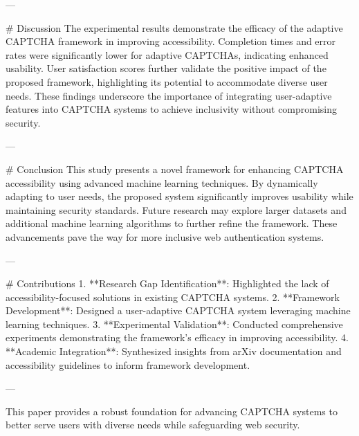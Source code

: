 ---

# Discussion  
The experimental results demonstrate the efficacy of the adaptive CAPTCHA framework in improving accessibility. Completion times and error rates were significantly lower for adaptive CAPTCHAs, indicating enhanced usability. User satisfaction scores further validate the positive impact of the proposed framework, highlighting its potential to accommodate diverse user needs. These findings underscore the importance of integrating user-adaptive features into CAPTCHA systems to achieve inclusivity without compromising security.

---

# Conclusion  
This study presents a novel framework for enhancing CAPTCHA accessibility using advanced machine learning techniques. By dynamically adapting to user needs, the proposed system significantly improves usability while maintaining security standards. Future research may explore larger datasets and additional machine learning algorithms to further refine the framework. These advancements pave the way for more inclusive web authentication systems.

---

# Contributions  
1. **Research Gap Identification**: Highlighted the lack of accessibility-focused solutions in existing CAPTCHA systems.  
2. **Framework Development**: Designed a user-adaptive CAPTCHA system leveraging machine learning techniques.  
3. **Experimental Validation**: Conducted comprehensive experiments demonstrating the framework's efficacy in improving accessibility.  
4. **Academic Integration**: Synthesized insights from arXiv documentation and accessibility guidelines to inform framework development.  

--- 

This paper provides a robust foundation for advancing CAPTCHA systems to better serve users with diverse needs while safeguarding web security.
